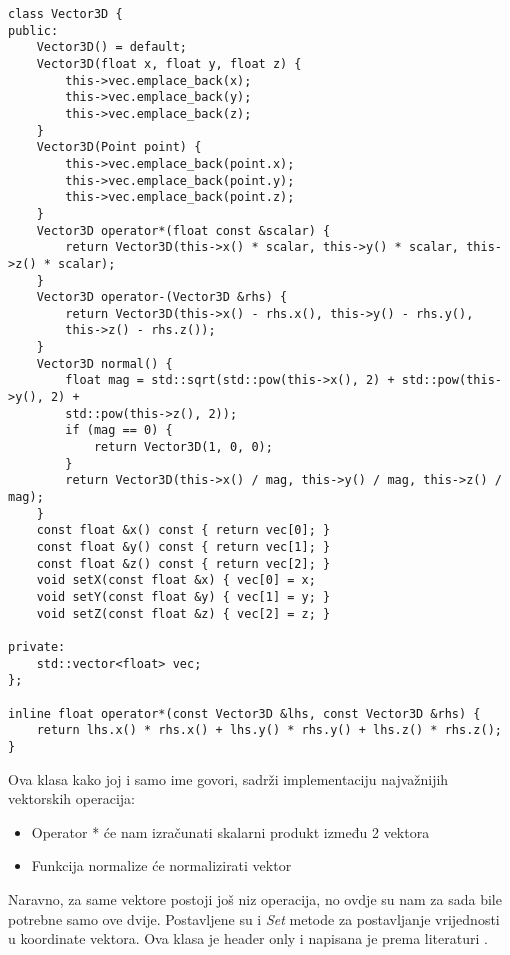 \begin{lstlisting}[style = myC++, label = {code:9}, caption={Implementacija klase Vector3D}]
class Vector3D {
public:
	Vector3D() = default;
	Vector3D(float x, float y, float z) {
		this->vec.emplace_back(x);
		this->vec.emplace_back(y);
		this->vec.emplace_back(z);
	}
	Vector3D(Point point) {
		this->vec.emplace_back(point.x);
		this->vec.emplace_back(point.y);
		this->vec.emplace_back(point.z);
	}
	Vector3D operator*(float const &scalar) {
		return Vector3D(this->x() * scalar, this->y() * scalar, this->z() * scalar);
	}
	Vector3D operator-(Vector3D &rhs) {
		return Vector3D(this->x() - rhs.x(), this->y() - rhs.y(),
		this->z() - rhs.z());
	}
	Vector3D normal() {
		float mag = std::sqrt(std::pow(this->x(), 2) + std::pow(this->y(), 2) +
		std::pow(this->z(), 2));
		if (mag == 0) {
			return Vector3D(1, 0, 0);
		}
		return Vector3D(this->x() / mag, this->y() / mag, this->z() / mag);
	}
	const float &x() const { return vec[0]; }
	const float &y() const { return vec[1]; }
	const float &z() const { return vec[2]; }
	void setX(const float &x) { vec[0] = x; 
	void setY(const float &y) { vec[1] = y; }
	void setZ(const float &z) { vec[2] = z; }

private:
	std::vector<float> vec;
};

inline float operator*(const Vector3D &lhs, const Vector3D &rhs) {
	return lhs.x() * rhs.x() + lhs.y() * rhs.y() + lhs.z() * rhs.z();
}

\end{lstlisting}
Ova klasa kako joj i samo ime govori, sadrži implementaciju najvažnijih vektorskih operacija:
\begin{itemize}
	\item Operator * će nam izračunati skalarni produkt između 2 vektora
	\item Funkcija normalize će normalizirati vektor
\end{itemize}
Naravno, za same vektore postoji još niz operacija, no ovdje su nam za sada bile potrebne samo ove dvije. Postavljene su i \emph{Set} metode za postavljanje vrijednosti u koordinate vektora. Ova klasa je header only i napisana je prema literaturi \cite{2}.

